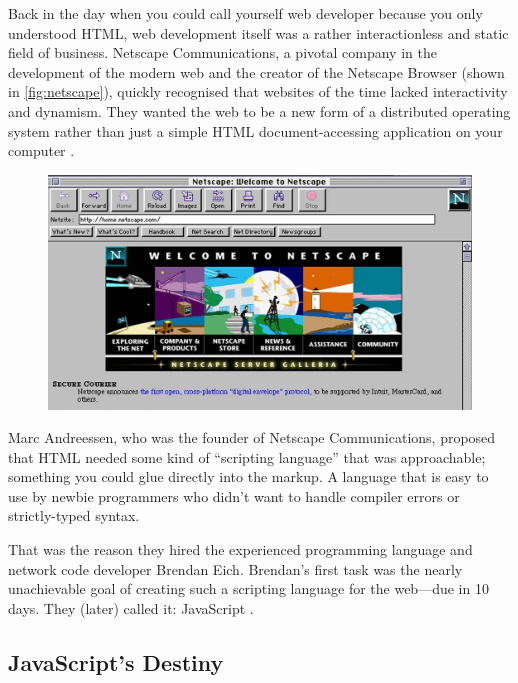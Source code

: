 \documentclass[10pt]{article}
\begin{document}
\begin{sloppypar}
  Back in the day when you could call yourself web developer because you only understood HTML, web development itself was a rather interactionless and static field of business. Netscape Communications, a pivotal company in the development of the modern web and the creator of the Netscape Browser (shown in \autoref{fig:netscape}), quickly recognised that websites of the time lacked interactivity and dynamism. They wanted the web to be a new form of a distributed operating system rather than just a simple HTML document-accessing application on your computer \citep{cassel_brendan_2018}.

  \begin{figure}[ht]
    \centering
    \includegraphics[width=\textwidth]{figures/netscape.jpg}
    \label{fig:netscape}
  \end{figure}

  Marc Andreessen, who was the founder of Netscape Communications, proposed that HTML needed some kind of “scripting language” that was approachable; something you could glue directly into the markup. A language that is easy to use by newbie programmers who didn’t want to handle compiler errors or strictly-typed syntax.

  That was the reason they hired the experienced programming language and network code developer Brendan Eich. Brendan’s first task was the nearly unachievable goal of creating such a scripting language for the web—due in 10 days. They (later) called it: JavaScript \citep{severance_javascript_2012}.

  \subsection{JavaScript’s Destiny}
  \label{sec:javascript-destiny}


\end{sloppypar}
\end{document}
